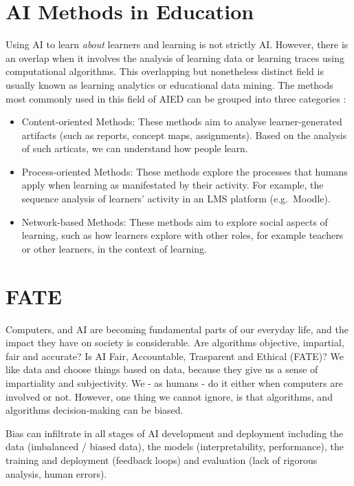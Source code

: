\documentclass[
]{book}
\providecommand{\tightlist}{%
  \setlength{\itemsep}{0pt}\setlength{\parskip}{0pt}}
\begin{document}
\section{AI Methods in Education}\label{ai-methods-in-education}

Using AI to learn \emph{about} learners and learning is not strictly AI. However, there is an overlap when it involves the analysis of learning data or learning traces using computational algorithms. This overlapping but nonetheless distinct field is usually known as learning analytics or educational data mining. The methods most commonly used in this field of AIED can be grouped into three categories \citep{hoppe2017computational}:

\begin{itemize}
\tightlist
\item
  Content-oriented Methods: These methods aim to analyse learner-generated artifacts (such as reports, concept maps, assignments). Based on the analysis of such articats, we can understand how people learn.
\item
  Process-oriented Methods: These methods explore the processes that humans apply when learning as manifestated by their activity. For example, the sequence analysis of learners' activity in an LMS platform (e.g.~Moodle).
\item
  Network-based Methods: These methods aim to explore social aspects of learning, such as how learners explore with other roles, for example teachers or other learners, in the context of learning.
\end{itemize}

\section{FATE}\label{fate}

Computers, and AI are becoming fundamental parts of our everyday life, and the impact they have on society is considerable. Are algorithms objective, impartial, fair and accurate? Is AI Fair, Accountable, Trasparent and Ethical (FATE)?
We like data and choose things based on data, because they give us a sense of impartiality and subjectivity. We - as humans - do it either when computers are involved or not. However, one thing we cannot ignore, is that algorithms, and algorithms decision-making can be biased.

Bias can infiltrate in all stages of AI development and deployment including the data (imbalanced / biased data), the models (interpretability, performance), the training and deployment (feedback loops) and evaluation (lack of rigorous analysis, human errors).
\end{document}
